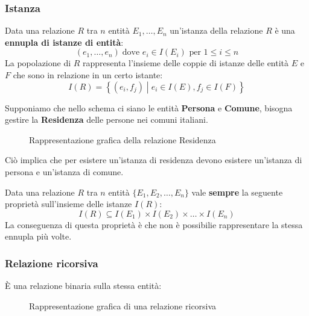 \documentclass[a4paper]{article}
\begin{document}
\subsubsection{Istanza}
Data una relazione \( R \) tra \( n \) entità \( E_1, \ldots, E_n \) un'istanza della
relazione \( R \) è una \textbf{ennupla di istanze di entità}:
\[
  (e_1, \ldots, e_n) \; \text{dove } e_i \in I(E_i) \text{ per } 1 \le i \le n
\] 
La popolazione di \( R \) rappresenta l'insieme delle coppie di istanze delle entità
\( E \) e \( F \) che sono in relazione in un certo istante:
\[
  I(R) = \left\{ (e_i, f_j) \;\left|\; e_i \in I(E), f_j \in I(F) \right.\right\} 
\]
\begin{example}
  Supponiamo che nello schema ci siano le entità \textbf{Persona} e \textbf{Comune},
  bisogna gestire la \textbf{Residenza} delle persone nei comuni italiani.

  \vspace{2em}
  \noindent
  \begin{figure}[H]
    \centering
    \caption{Rappresentazione grafica della relazione Residenza}
  \end{figure}
  \noindent
  Ciò implica che per esistere un'istanza di residenza devono esistere un'istanza
  di persona e un'istanza di comune.
\end{example}
Data una relazione \( R \) tra \( n \) entità \( \{E_1, E_2, \ldots, E_n\} \)
vale \textbf{sempre} la seguente proprietà sull'insieme delle istanze \( I(R) \):
\[
  I(R) \subseteq I(E_1) \times I(E_2) \times \ldots \times I(E_n)
\] 
La conseguenza di questa proprietà è che non è possibilie rappresentare la stessa ennupla
più volte.

\subsubsection{Relazione ricorsiva}
È una relazione binaria sulla stessa entità:
\begin{figure}[H]
  \centering
  \caption{Rappresentazione grafica di una relazione ricorsiva}
\end{figure}
\end{document}
